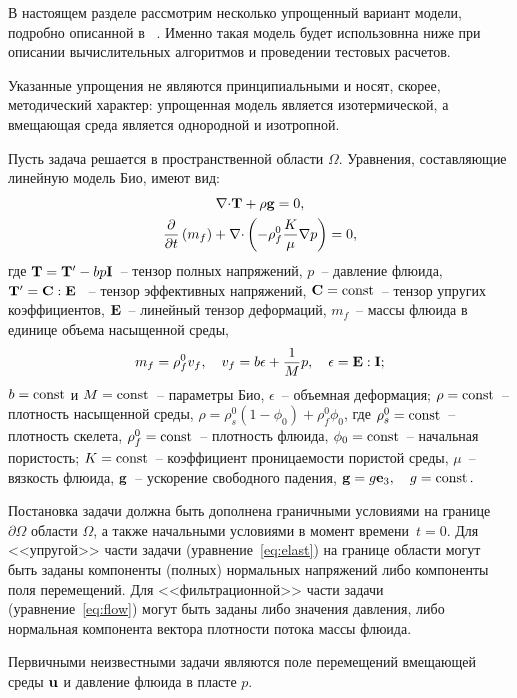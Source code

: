 

В настоящем разделе рассмотрим несколько упрощенный вариант модели, подробно описанной в ~\cite{Borisov2017}. Именно такая модель будет использовнна ниже при
описании вычислительных алгоритмов и проведении тестовых расчетов. 

Указанные упрощения не являются принципиальными и носят, скорее,
методический характер: упрощенная модель является изотермической, 
а вмещающая среда является однородной и изотропной.

Пусть задача решается в пространственной области $\Omega$.
Уравнения, составляющие линейную модель Био, имеют вид:
%
\begin{gather}
\label{eq:elast}
\nabla \dpr\tn{T} +\rho\vc{g} = 0,\\
%
\label{eq:flow}
\dudx{}{t}\left( m_f \right) + \nabla \dpr \left( - \rho_f^0 \frac{K}{\mu}\nabla p\right) = 0,
%
\end{gather}
%
где
%
$\mathbf{T} = \mathbf{T}' - b p \mathbf{I}$~-- тензор полных напряжений, $p$~-- давление флюида,
%
\(
\mathbf{T}' = \mathbf{C}:\mathbf{E}
\)
%
~-- тензор эффективных напряжений, $\mathbf{C}=\operatorname*{{const}}$~-- тензор упругих коэффициентов, 
$\mathbf{E}$~-- линейный тензор деформаций,
%
$m_f$~-- массы флюида в единице объема насыщенной среды,
%
\[
m_f = \rho_f^0 v_f, \quad v_f = b\epsilon + \frac{1}{M} p,\quad \epsilon = \mathbf{E}:\mathbf{I};
\]
%
$b=\operatorname*{{const}}$ и $M=\operatorname*{{const}}$~-- параметры Био,
 $\epsilon$~-- объемная деформация;
%
$\rho = \operatorname*{{const}}$~-- плотность насыщенной среды,
%
$\rho = \rho_s^0 (1-\phi_0) + \rho_f^0\phi_0$, где
%
$\rho_s^0=\operatorname*{{const}}$~-- плотность скелета, $\rho_f^0=\operatorname*{{const}}$~-- плотность флюида, $\phi_0=\operatorname*{{const}}$~-- начальная пористость;
%
$K=\operatorname*{{const}}$~-- коэффициент проницаемости пористой среды,
%
$\mu$~-- вязкость флюида,
%
$\mathbf{g}$~-- ускорение свободного падения, 
$
\mathbf{g} = g\mathbf{e}_3,\quad g = \operatorname*{{const}}.
$
%

Постановка задачи должна быть дополнена граничными условиями на границе $\partial\Omega$ области
$\Omega$, а также начальными условиями в момент времени~$t=0$. 
Для <<упругой>> части задачи (уравнение~\eqref{eq:elast}) на границе
области могут быть заданы компоненты (полных) нормальных напряжений
либо компоненты поля перемещений. Для <<фильтрационной>> части задачи
(уравнение~\eqref{eq:flow})
могут быть заданы либо значения давления, либо нормальная компонента
вектора плотности потока массы флюида.

Первичными неизвестными задачи являются поле перемещений вмещающей среды $\mathbf{u}$ и давление
флюида в пласте $p$.


\endinput
